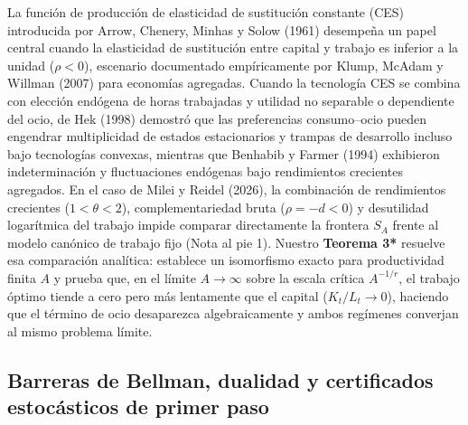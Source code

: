 \documentclass[11pt,letterpaper]{article}
\theoremstyle{plain}
\begin{document}
La función de producción de elasticidad de sustitución constante (CES) introducida por Arrow, Chenery, Minhas y Solow (1961) desempeña un papel central cuando la elasticidad de sustitución entre capital y trabajo es inferior a la unidad ($\rho<0$), escenario documentado empíricamente por Klump, McAdam y Willman (2007) para economías agregadas. Cuando la tecnología CES se combina con elección endógena de horas trabajadas y utilidad no separable o dependiente del ocio, de Hek (1998) demostró que las preferencias consumo--ocio pueden engendrar multiplicidad de estados estacionarios y trampas de desarrollo incluso bajo tecnologías convexas, mientras que Benhabib y Farmer (1994) exhibieron indeterminación y fluctuaciones endógenas bajo rendimientos crecientes agregados. En el caso de Milei y Reidel (2026), la combinación de rendimientos crecientes ($1<\theta<2$), complementariedad bruta ($\rho=-d<0$) y desutilidad logarítmica del trabajo impide comparar directamente la frontera $S_A$ frente al modelo canónico de trabajo fijo (Nota al pie 1). Nuestro \textbf{Teorema 3*} resuelve esa comparación analítica: establece un isomorfismo exacto para productividad finita $A$ y prueba que, en el límite $A\to\infty$ sobre la escala crítica $A^{-1/r}$, el trabajo óptimo tiende a cero pero más lentamente que el capital ($K_t/L_t\to 0$), haciendo que el término de ocio desaparezca algebraicamente y ambos regímenes converjan al mismo problema límite.

\subsection{Barreras de Bellman, dualidad y certificados estocásticos de primer paso}
\end{document}
